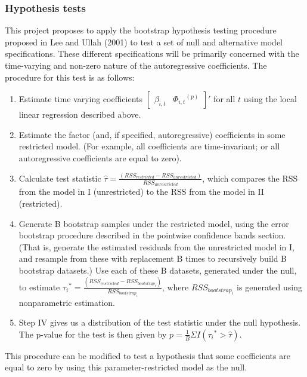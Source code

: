 \documentclass{article}
\begin{document}
\subsubsection{Hypothesis tests}
This project proposes to apply the bootstrap hypothesis testing procedure proposed in Lee and Ullah (2001) to test a set of null and alternative model specifications. These different specifications will be primarily concerned with the time-varying and non-zero nature of the autoregressive coefficients. The procedure for this test is as follows:
\renewcommand{\theenumi}{\Roman{enumi}}
\begin{enumerate}
	\item{Estimate time varying coefficients \({\begin{bmatrix}\beta_{i,t} &{\Phi_{i,t}}^{(p)}\end{bmatrix}}' \) for all \(t\) using the local linear regression described above.}
	\item{Estimate the factor (and, if specified, autoregressive) coefficients in some restricted model. (For example, all coefficients are time-invariant; or all autoregressive coefficients are equal to zero).}
	\item{Calculate test statistic \(\hat{\tau} = \frac{(RSS_{restricted} - RSS_{unrestricted})}{RSS_{unrestricted}}\), which compares the RSS from the model in I (unrestricted) to the RSS from the model in II (restricted).}
	\item{Generate B bootstrap samples under the restricted model, using the error bootstrap procedure described in the pointwise confidence bands section. (That is, generate the estimated residuals from the unrestricted model in I, and resample from these with replacement B times to recursively build B bootstrap datasets.) Use each of these B datasets, generated under the null, to estimate \({\tau_{i}}^{*} = \frac{(RSS_{restricted} - RSS_{bootstrap_{i}})}{RSS_{bootstrap_{i}}}\), where \(RSS_{bootstrap_{i}}\) is generated using nonparametric estimation.}
	\item{Step IV gives us a distribution of the test statistic under the null hypothesis. The p-value for the test is then given by \( p = \frac{1}{B} \Sigma I({\tau_{i}}^{*} >  \hat{\tau}) \).}
\end{enumerate}
\noindent
This procedure can be modified to test a hypothesis that some coefficients are equal to zero by using this parameter-restricted model as the null.
\newline
\newline
\end{document}
